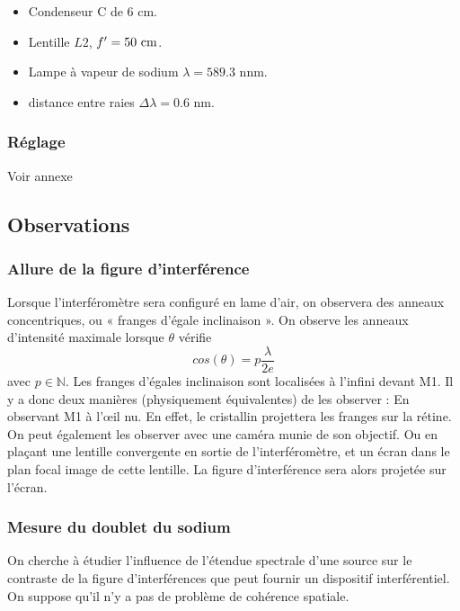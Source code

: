\documentclass[french]{article}
\begin{document}
\begin{remarque}
	\begin{itemize}
		\item Condenseur C de 6 cm.
		\item Lentille $L2$, $f'= 50~\rm cm$.
		\item Lampe à vapeur de sodium $\lambda = 589.3$ nnm.
		\item distance entre raies $\Delta\lambda = 0.6$ nm.
	\end{itemize}
\end{remarque}

\subsubsection{Réglage}

Voir annexe
\subsection{Observations}

\subsubsection{Allure de la figure d'interférence}

Lorsque l’interféromètre sera configuré en lame d’air, on observera des anneaux concentriques,
ou « franges d’égale inclinaison ». On observe les anneaux d'intensité maximale lorsque $\theta$ vérifie $$cos(\theta) = p
\frac{\lambda}{2e}$$ avec $p\in \mathbb{N}$. Les franges d’égales inclinaison sont localisées à l’infini devant M1. Il y a donc deux manières (physiquement équivalentes) de les observer : En observant M1 à l’œil nu. En effet, le cristallin projettera les franges sur la rétine. On peut également les observer avec une caméra munie de son objectif. Ou en plaçant une lentille convergente en sortie de l’interféromètre, et un écran dans le plan focal image de cette lentille. La figure d’interférence sera alors projetée sur l’écran.

\subsubsection{Mesure du doublet du sodium}
On cherche à étudier l'influence de l'étendue spectrale d'une source sur le contraste de la figure d'interférences que peut fournir un dispositif interférentiel. On suppose qu'il n'y a pas de problème de cohérence spatiale.\vspace{.5cm}
\end{document}
